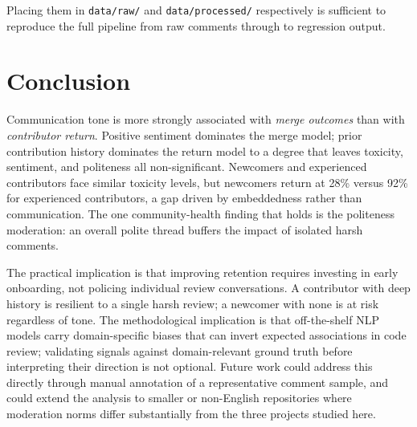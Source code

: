 \documentclass[12pt,a4paper]{article}
\begin{document}
Placing them in \texttt{data/raw/} and \texttt{data/processed/} respectively is sufficient to reproduce the full pipeline from raw comments through to regression output.

\section{Conclusion}

Communication tone is more strongly associated with \emph{merge outcomes} than with \emph{contributor return}. Positive sentiment dominates the merge model; prior contribution history dominates the return model to a degree that leaves toxicity, sentiment, and politeness all non-significant. Newcomers and experienced contributors face similar toxicity levels, but newcomers return at 28\% versus 92\% for experienced contributors, a gap driven by embeddedness rather than communication. The one community-health finding that holds is the politeness moderation: an overall polite thread buffers the impact of isolated harsh comments.

The practical implication is that improving retention requires investing in early onboarding, not policing individual review conversations. A contributor with deep history is resilient to a single harsh review; a newcomer with none is at risk regardless of tone. The methodological implication is that off-the-shelf NLP models carry domain-specific biases that can invert expected associations in code review; validating signals against domain-relevant ground truth before interpreting their direction is not optional. Future work could address this directly through manual annotation of a representative comment sample, and could extend the analysis to smaller or non-English repositories where moderation norms differ substantially from the three projects studied here.



\end{document}
